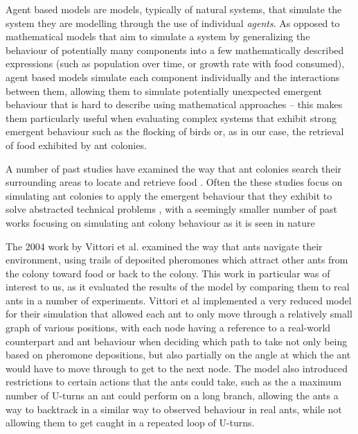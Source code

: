 
    Agent based models are models, typically of natural systems, that simulate the system they are modelling through the use of individual \textit{agents}. As opposed to mathematical models that aim to simulate
    a system by generalizing the behaviour of potentially many components into a few mathematically described expressions (such as population over time, or growth rate with food consumed), agent based models simulate
    each component individually and the interactions between them\cite{jeff}, allowing them to simulate potentially unexpected emergent behaviour that is hard to describe using mathematical approaches -- this makes them
    particularly useful when evaluating complex systems that exhibit strong emergent behaviour such as the flocking of birds or, as in our case, the retrieval of food exhibited by ant colonies.
    
    A number of past studies have examined the way that ant colonies search their surrounding areas to locate and retrieve food \cite{vittori_modeling_2004, a_panait_ant_2004}.
    Often the these studies focus on simulating ant colonies to apply the emergent behaviour that they exhibit to solve abstracted technical
    problems \cite{dorigo_ant_2006, zhang_improved_2007}, with a seemingly smaller number of past works focusing on simulating ant colony behaviour as it is seen in nature \cite{vittori_modeling_2004} %
    

    The 2004 work by Vittori et al.\cite{vittori_modeling_2004} examined the way that ants navigate their environment, using trails of deposited pheromones which attract other ants from the colony toward food or back
    to the colony. This work in particular was of interest to us, as it evaluated the results of the model by comparing them to real ants in a number of experiments. Vittori et al implemented a very reduced model for
    their simulation that allowed each ant to only move through a relatively small graph of various positions, with each node having a reference to a real-world counterpart and ant behaviour when deciding
    which path to take not only being based on pheromone depositions, but also partially on the angle at which the ant would have to move through to get to the next node. The model also introduced restrictions to
    certain actions that the ants could take, such as the a maximum number of U-turns an ant could perform on a long branch, allowing the ants a way to backtrack in a similar way to observed behaviour in real ants, while 
    not allowing them to get caught in a repeated loop of U-turns.

